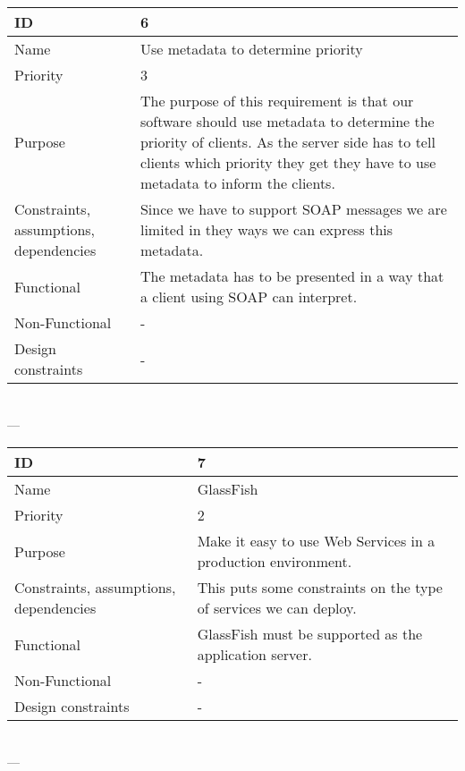 \begin{center}
    \begin{tabular}{| p{4cm} | p{8cm} |}
        \hline
        ID & 6 \\
        \hline
        Name & Use metadata to determine priority  \\
        \hline
        Priority & 3 \\
        \hline
        Purpose & The purpose of this requirement is that our software should use metadata to determine the priority of clients. As the server side has to tell clients which priority they get they have to use metadata to inform the clients. \\
        \hline 
        Constraints, assumptions, dependencies & Since we have to support SOAP messages we are limited in they ways we can express this metadata. \\
        \hline  
        Functional & The metadata has to be presented in a way that a client using SOAP can interpret. \\
        \hline
        Non-Functional & -\\ 
        \hline
        Design constraints & -\\
        \hline
    \end{tabular}
    \\  ---  \\
    
    \begin{tabular}{| p{4cm} | p{8cm} |}
        \hline
        ID & 7 \\
        \hline
        Name & GlassFish \\
        \hline
        Priority & 2 \\
        \hline
        Purpose & Make it easy to use Web Services in a production environment. \\
        \hline 
        Constraints, assumptions, dependencies & This puts some constraints on the type of services we can deploy. \\
        \hline  
        Functional & GlassFish must be supported as the application server.  \\
        \hline
        Non-Functional & - \\ 
        \hline
        Design constraints & - \\
        \hline
    \end{tabular}
    \\  ---  \\
    

\end{center}
